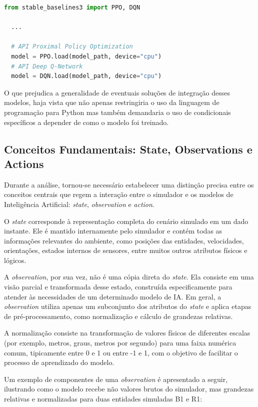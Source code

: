 \vspace{0.5cm}

\begin{lstlisting}[language=python]
  from stable_baselines3 import PPO, DQN

  ...
  
  # API Proximal Policy Optimization
  model = PPO.load(model_path, device="cpu")
  # API Deep Q-Network
  model = DQN.load(model_path, device="cpu")
\end{lstlisting}

O que prejudica a generalidade de eventuais soluções de integração desses modelos, haja vista que não apenas restringiria o uso da linguagem de programação para Python mas também demandaria o uso de condicionais específicos a depender de como o modelo foi treinado.

\subsection{Conceitos Fundamentais: State, Observations e Actions}

Durante a análise, tornou-se necessário estabelecer uma distinção precisa entre os conceitos centrais que regem a interação entre o simulador e os modelos de Inteligência Artificial: \emph{state}, \emph{observation} e \emph{action}.

O \textit{state} corresponde à representação completa do cenário simulado em um dado instante. Ele é mantido internamente pelo simulador e contém todas as informações relevantes do ambiente, como posições das entidades, velocidades, orientações, estados internos de sensores, entre muitos outros atributos físicos e lógicos.

A \textit{observation}, por sua vez, não é uma cópia direta do \textit{state}. Ela consiste em uma visão parcial e transformada desse estado, construída especificamente para atender às necessidades de um determinado modelo de IA. Em geral, a \textit{observation} utiliza apenas um subconjunto dos atributos do \textit{state} e aplica etapas de pré-processamento, como normalização e cálculo de grandezas relativas.

A normalização consiste na transformação de valores físicos de diferentes escalas (por exemplo, metros, graus, metros por segundo) para uma faixa numérica comum, tipicamente entre 0 e 1 ou entre -1 e 1, com o objetivo de facilitar o processo de aprendizado do modelo.

Um exemplo de componentes de uma \textit{observation} é apresentado a seguir, ilustrando como o modelo recebe não valores brutos do simulador, mas grandezas relativas e normalizadas para duas entidades simuladas B1 e R1:

